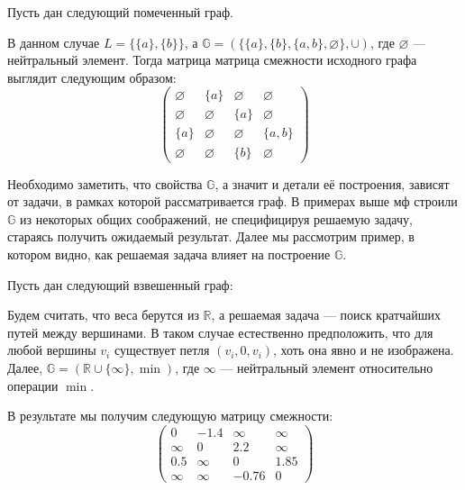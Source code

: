 \begin{example}
  Пусть дан следующий помеченный граф.
  \begin{center}
    
  \end{center}

  В данном случае $L = \{\{a\},\{b\}\}$, а $\mathbb{G} = ( \{\{a\},\{b\},\{a,b\},\varnothing\} ,\cup)$, где $\varnothing$ --- нейтральный элемент.
  Тогда матрица матрица смежности исходного графа выглядит следующим образом:
  $$
  \begin{pmatrix}
    \varnothing   & \{a\}       & \varnothing & \varnothing \\
    \varnothing   & \varnothing & \{a\}       & \varnothing \\
    \{a\}         & \varnothing & \varnothing & \{a,b\} \\
    \varnothing   & \varnothing & \{b\}       & \varnothing
  \end{pmatrix}
  $$
\end{example}

Необходимо заметить, что свойства $\mathbb{G}$, а значит и детали её построения, зависят от задачи, в рамках которой рассматривается граф. В примерах выше мф строили $\mathbb{G}$ из некоторых общих соображений, не специфицируя решаемую задачу, стараясь получить ожидаемый результат. Далее мы рассмотрим пример, в котором видно, как решаемая задача влияет на построение $\mathbb{G}$.

\begin{example}\label{example:apspGraph}
  Пусть дан следующий взвешенный граф:
  \begin{center}
    
  \end{center}

  Будем считать, что веса берутся из $\mathbb{R}$, а решаемая задача --- поиск кратчайших путей между вершинами. В таком случае естественно предположить, что для любой вершины $v_i$ существует петля $(v_i,0,v_i)$, хоть она явно и не изображена. Далее, $\mathbb{G} = ( \mathbb{R}\cup \{\infty\} , \min)$, где $\infty$ --- нейтральный элемент относительно операции $\min$. 

  В результате мы получим следующую матрицу смежности:
  $$
  \begin{pmatrix}
    0 & -1.4 & \infty & \infty \\
    \infty & 0 & 2.2 & \infty \\
    0.5 & \infty & 0 & 1.85 \\
    \infty & \infty & -0.76 & 0
  \end{pmatrix}
  $$
\end{example}

